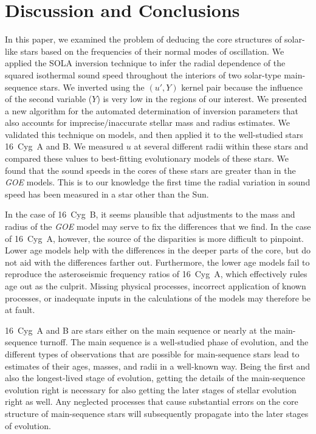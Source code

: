 \section{Discussion and Conclusions} 
In this paper, we examined the problem of deducing the core structures of solar-like stars based on the frequencies of their normal modes of oscillation. 
We applied the SOLA inversion technique to infer the radial dependence of the squared isothermal sound speed throughout the interiors of two solar-type main-sequence stars. 
We inverted using the $(u',Y)$ kernel pair because the influence of the second variable (${Y}$) is very low in the regions of our interest. 
We presented a new algorithm for the automated determination of inversion parameters that also accounts for imprecise/inaccurate stellar mass and radius estimates. 
We validated this technique on models, and then applied it to the well-studied stars 16~Cyg~A and B. 
We measured $u$ at several different radii within these stars and compared these values to best-fitting evolutionary models of these stars. 
We found that the sound speeds in the cores of these stars are greater than in the \emph{GOE} models. 
This is to our knowledge the first time the radial variation in sound speed has been measured in a star other than the Sun. 


In the case of 16~Cyg~B, it seems plausible that adjustments to the mass and radius of the \emph{GOE} model may serve to fix the differences that we find. 
In the case of 16~Cyg~A, however, the source of the disparities is more difficult to pinpoint. 
Lower age models help with the differences in the deeper parts of the core, but do not aid with the differences farther out. 
Furthermore, the lower age models fail to reproduce the asteroseismic frequency ratios of 16~Cyg~A, which effectively rules age out as the culprit. 
Missing physical processes, incorrect application of known processes, or inadequate inputs in the calculations of the models may therefore be at fault. 


16~Cyg~A and B are stars either on the main sequence or nearly at the main-sequence turnoff. 
The main sequence is a well-studied phase of evolution, and the different types of observations that are possible for main-sequence stars lead to estimates of their ages, masses, and radii in a well-known way. 
Being the first and also the longest-lived stage of evolution, getting the details of the main-sequence evolution right is necessary for also getting the later stages of stellar evolution right as well. 
Any neglected processes that cause substantial errors on the core structure of main-sequence stars will subsequently propagate into the later stages of evolution. 


